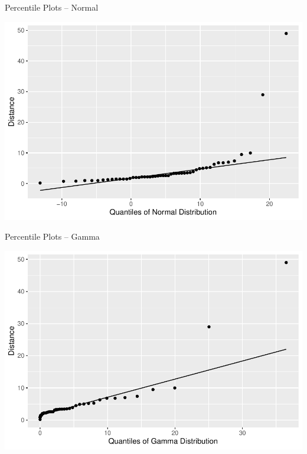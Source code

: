 \begin{frame}

\begin{block}{Percentile Plots -- Normal}

\begin{center}
\includegraphics[height=.7\textheight]{figure/qqnorm-1.pdf}
\end{center}

\end{block}
\end{frame}




\begin{frame}

\begin{block}{Percentile Plots -- Gamma}

\begin{center}
\includegraphics[height=.7\textheight]{figure/qqgamma-1.pdf}
\end{center}

\end{block}
\end{frame}




